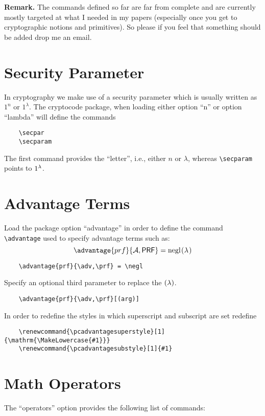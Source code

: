 \documentclass[a4paper]{report}
\begin{document}
\textbf{Remark. } The commands defined so far are far from complete and are currently mostly targeted at what I needed in my
papers (especially once you get to cryptographic notions and primitives). So please if you feel that something should be added
drop me an email.

\section{Security Parameter}
In cryptography we make use of a security parameter which is usually written as $1^n$ or $1^\lambda$. The cryptocode
package, when loading either option \enquote{n} or option \enquote{lambda} will define the commands
\begin{lstlisting}
	\secpar
	\secparam
\end{lstlisting}
The first command provides the \enquote{letter}, i.e., either $n$ or $\lambda$, whereas \lstinline$\secparam$ points
to $1^{\lambda}$.

\section{Advantage Terms}
Load the package option ``advantage'' in order to define the command \lstinline$\advantage$ used to specify advantage terms such as:
\[
\advantage{prf}{\adv,\prf} = \negl
\]
\begin{lstlisting}
	\advantage{prf}{\adv,\prf} = \negl
\end{lstlisting}
Specify an optional third parameter to replace the $(\lambda)$.
\begin{lstlisting}
	\advantage{prf}{\adv,\prf}[(arg)]
\end{lstlisting}
In order to redefine the styles in which superscript and subscript are set redefine
\begin{lstlisting}
	\renewcommand{\pcadvantagesuperstyle}[1]{\mathrm{\MakeLowercase{#1}}}
	\renewcommand{\pcadvantagesubstyle}[1]{#1}
\end{lstlisting}

\section{Math Operators}
The \enquote{operators} option provides the following list of commands:
\end{document}
